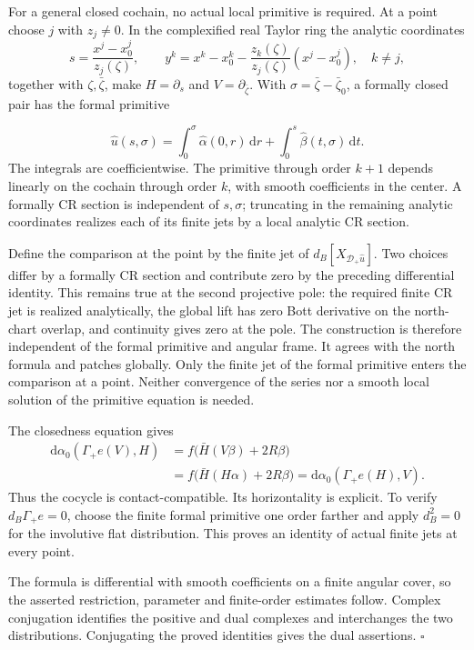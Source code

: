 \documentclass[
  english,
  11pt,
  reqno]{amsart}
\begin{document}
For a general closed cochain, no actual local primitive is required. At
a point choose \(j\) with \(z_j\ne0\). In the complexified real Taylor
ring the analytic coordinates \[
s=\frac{x^j-x_0^j}{z_j(\zeta)},\qquad
y^k=x^k-x_0^k-\frac{z_k(\zeta)}{z_j(\zeta)}(x^j-x_0^j),
\quad k\ne j,
\] together with \(\zeta,\bar\zeta\), make \(H=\partial_s\) and
\(V=\partial_{\bar\zeta}\). With \(\sigma=\bar\zeta-\bar\zeta_0\), a
formally closed pair has the formal primitive

\label{eq:online-contact-finite-jet-primitive} \[
\widehat u(s,\sigma)
=\int_0^\sigma\widehat\alpha(0,r)\,\mathrm dr
 +\int_0^s\widehat\beta(t,\sigma)\,\mathrm dt.
\] The integrals are coefficientwise. The primitive through order
\(k+1\) depends linearly on the cochain through order \(k\), with smooth
coefficients in the center. A formally CR section is independent of
\(s,\sigma\); truncating in the remaining analytic coordinates realizes
each of its finite jets by a local analytic CR section.

Define the comparison at the point by the finite jet of
\(d_B[X_{\mathcal D_+\widehat u}]\). Two choices differ by a formally CR
section and contribute zero by the preceding differential identity. This
remains true at the second projective pole: the required finite CR jet
is realized analytically, the global lift has zero Bott derivative on
the north-chart overlap, and continuity gives zero at the pole. The
construction is therefore independent of the formal primitive and
angular frame. It agrees with the north formula and patches globally.
Only the finite jet of the formal primitive enters the comparison at a
point. Neither convergence of the series nor a smooth local solution of
the primitive equation is needed.

The closedness equation gives \[
\begin{aligned}
\mathrm d\alpha_0(\Gamma_+e(V),H)
&=f\bigl(\bar H(V\beta)+2R\beta\bigr)\\
&=f\bigl(\bar H(H\alpha)+2R\beta\bigr)
=\mathrm d\alpha_0(\Gamma_+e(H),V).
\end{aligned}
\] Thus the cocycle is contact-compatible. Its horizontality is
explicit. To verify \(d_B\Gamma_+e=0\), choose the finite formal
primitive one order farther and apply \(d_B^2=0\) for the involutive
flat distribution. This proves an identity of actual finite jets at
every point.

The formula is differential with smooth coefficients on a finite angular
cover, so the asserted restriction, parameter and finite-order estimates
follow. Complex conjugation identifies the positive and dual complexes
and interchanges the two distributions. Conjugating the proved
identities gives the dual assertions. \hfill\(\square\)
\end{document}

